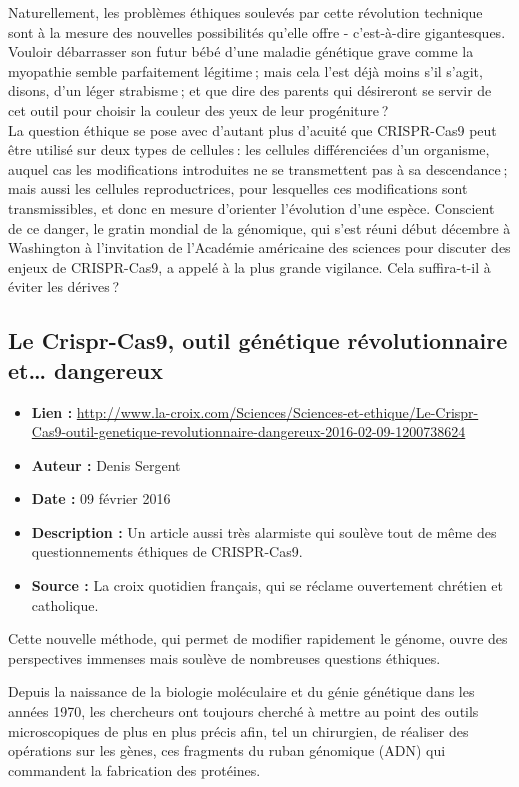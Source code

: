 \documentclass[8pt]{article}
\begin{document}
Naturellement, les problèmes éthiques soulevés par cette révolution technique sont à la mesure des nouvelles possibilités qu'elle offre - c'est-à-dire gigantesques. Vouloir débarrasser son futur bébé d'une maladie génétique grave comme la myopathie semble parfaitement légitime ; mais cela l'est déjà moins s'il s'agit, disons, d'un léger strabisme ; et que dire des parents qui désireront se servir de cet outil pour choisir la couleur des yeux de leur progéniture ? \\

La question éthique se pose avec d'autant plus d'acuité que CRISPR-Cas9 peut être ­utilisé sur deux types de cellules : les cellules différenciées d'un organisme, auquel cas les modifications introduites ne se transmettent pas à sa descendance ; mais aussi les cellules reproductrices, pour lesquelles ces modifications sont transmissibles, et donc en mesure d'orienter l'évolution d'une espèce. Conscient de ce danger, le gratin mondial de la géno­mique, qui s'est réuni début décembre à Washington à l'invitation de l'Académie américaine des sciences pour discuter des enjeux de CRISPR-Cas9, a appelé à la plus grande vigilance. Cela suffira-t-il à éviter les dérives ?

\subsection{Le Crispr-Cas9, outil génétique révolutionnaire et… dangereux}
\begin{itemize}
	\item \textbf{Lien : }  \url{http://www.la-croix.com/Sciences/Sciences-et-ethique/Le-Crispr-Cas9-outil-genetique-revolutionnaire-dangereux-2016-02-09-1200738624} 
	\item \textbf{Auteur : } Denis Sergent
	\item \textbf{Date : } 09 février 2016
	\item \textbf{Description : } Un article aussi très alarmiste qui soulève tout de même des questionnements éthiques de CRISPR-Cas9.
	\item \textbf{Source : } La croix quotidien français, qui se réclame ouvertement chrétien et catholique.
\end{itemize}

Cette nouvelle méthode, qui permet de modifier rapidement le génome, ouvre des perspectives immenses mais soulève de nombreuses questions éthiques.

Depuis la naissance de la biologie moléculaire et du génie génétique dans les années 1970, les chercheurs ont toujours cherché à mettre au point des outils microscopiques de plus en plus précis afin, tel un chirurgien, de réaliser des opérations sur les gènes, ces fragments du ruban génomique (ADN) qui commandent la fabrication des protéines.\\
\end{document}
